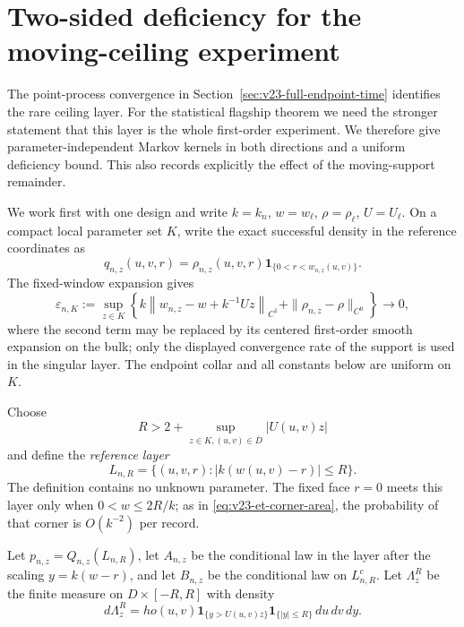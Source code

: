 \section{Two-sided deficiency for the moving-ceiling experiment}
\label{sec:v24-endpoint-time-deficiency}

The point-process convergence in Section~\ref{sec:v23-full-endpoint-time}
identifies the rare ceiling layer.  For the statistical flagship theorem we
need the stronger statement that this layer is the whole first-order
experiment.  We therefore give parameter-independent Markov kernels in both
directions and a uniform deficiency bound.  This also records explicitly the
effect of the moving-support remainder.

We work first with one design and write \(k=k_n\), \(w=w_\ell\),
\(\rho=\rho_\ell\), \(U=U_\ell\).  On a compact local parameter set \(K\),
write the exact successful density in the reference coordinates as
\[
 q_{n,z}(u,v,r)=\rho_{n,z}(u,v,r)
 \mathbf 1_{\{0<r<w_{n,z}(u,v)\}}.
\]
The fixed-window expansion gives
\begin{equation}\label{eq:v24-deficiency-remainder}
 \varepsilon_{n,K}:=
 \sup_{z\in K}
 \left\{
 k\left\|w_{n,z}-w+k^{-1}Uz\right\|_{C^1}
 +\|\rho_{n,z}-\rho\|_{C^0}
 \right\}\longrightarrow0,
\end{equation}
where the second term may be replaced by its centered first-order smooth
expansion on the bulk; only the displayed convergence rate of the support is
used in the singular layer.  The endpoint collar and all constants below are
uniform on \(K\).

Choose
\[
 R>2+\sup_{z\in K,(u,v)\in\overline D}|U(u,v)z|
\]
and define the \emph{reference layer}
\begin{equation}\label{eq:v24-reference-layer}
 L_{n,R}=\{(u,v,r):|k(w(u,v)-r)|\le R\}.
\end{equation}
The definition contains no unknown parameter.  The fixed face \(r=0\) meets
this layer only when \(0<w\le 2R/k\); as in
\eqref{eq:v23-et-corner-area}, the probability of that corner is
\(O(k^{-2})\) per record.

Let \(p_{n,z}=Q_{n,z}(L_{n,R})\), let \(A_{n,z}\) be the conditional law in
the layer after the scaling \(y=k(w-r)\), and let \(B_{n,z}\) be the
conditional law on \(L_{n,R}^c\).  Let \(\Lambda_z^R\) be the finite measure
on \(D\times[-R,R]\) with density
\begin{equation}\label{eq:v24-Lambda-R}
 d\Lambda_z^R=
ho(u,v)
  \mathbf 1_{\{y>U(u,v)z\}}\mathbf 1_{\{|y|\le R\}}\,du\,dv\,dy.
\end{equation}

